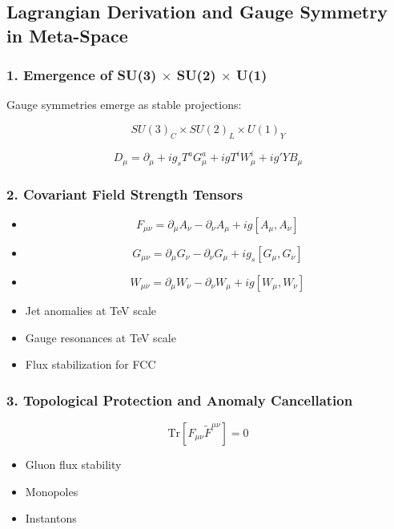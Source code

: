 \documentclass[10.5pt,a4paper]{article}
\begin{document}
\subsection{Lagrangian Derivation and Gauge Symmetry in Meta-Space}

\subsubsection*{1. Emergence of SU(3) \(\times\) SU(2) \(\times\) U(1)}

Gauge symmetries emerge as stable projections:

\[
    SU(3)_C \times SU(2)_L \times U(1)_Y
\]

\[
    D_\mu = \partial_\mu + i g_s T^a G^a_\mu + i g T^i W^i_\mu + i g' Y B_\mu
\]

\subsubsection*{2. Covariant Field Strength Tensors}

\begin{itemize}
    \item 
    \[
        F_{\mu\nu} = \partial_\mu A_\nu - \partial_\nu A_\mu + i g [A_\mu, A_\nu]
    \]
    \item
    \[
        G_{\mu\nu} = \partial_\mu G_\nu - \partial_\nu G_\mu + i g_s [G_\mu, G_\nu]
    \]
    \item
    \[
        W_{\mu\nu} = \partial_\mu W_\nu - \partial_\nu W_\mu + i g [W_\mu, W_\nu]
    \]
\end{itemize}

\begin{itemize}
    \item Jet anomalies at TeV scale
    \item Gauge resonances at TeV scale
    \item Flux stabilization for FCC
\end{itemize}

\subsubsection*{3. Topological Protection and Anomaly Cancellation}

\[
    \mathrm{Tr} [F_{\mu\nu} \tilde{F}^{\mu\nu}] = 0
\]

\begin{itemize}
    \item Gluon flux stability
    \item Monopoles
    \item Instantons
\end{itemize}
\end{document}
